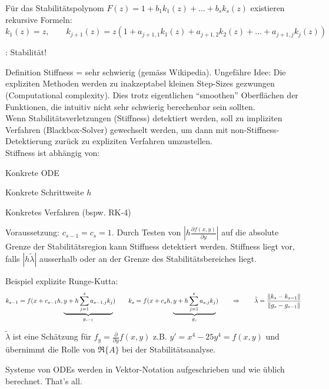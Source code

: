       \vspace{1em}
       
        Für das Stabilitätspolynom $F(z) = 1 + b_1 k_1(z) + \ldots + b_sk_s(z)$ existieren 
        rekursive Formeln:\\
        $k_1(z) = z, \qquad k_{j+1}(z) = z(1 + a_{j+1,1} k_1(z) + a_{j+1,2} k_2(z) + \ldots + a_{j+1,j} k_j(z))$
      
      \vspace{1em}
      : Stabilität!
    
      Definition Stiffness = sehr schwierig (gemäss Wikipedia). Ungefähre Idee: Die expliziten 
      Methoden werden zu inakzeptabel kleinen Step-Sizes gezwungen (Computational complexity). 
      Dies trotz eigentlichen "`smoothen"' Oberflächen der Funktionen, die intuitiv nicht sehr 
      schwierig berechenbar sein sollten. \\
      
      Wenn Stabilitätsverletzungen (Stiffness) detektiert werden, soll zu 
      impliziten Verfahren (Blackbox-Solver) gewechselt werden, um dann mit non-Stiffness-Detektierung 
      zurück zu expliziten Verfahren umzustellen.\\
      
      Stiffness ist abhängig von:
      \begin{liste}
        \item Konkrete ODE
        \item Konkrete Schrittweite $h$
        \item Konkretes Verfahren (bspw. RK-4)
      \end{liste}
      
        Voraussetzung: $c_{s-1} = c_s = 1$. Durch Testen von $\left|h \frac{\partial f(x,y)}{\partial y} \right|$ 
        auf die absolute Grenze der Stabilitätsregion kann
        Stiffness detektiert werden. 
        Stiffness liegt vor, falls $|h \tilde{\lambda}|$ ausserhalb
        oder an der Grenze des Stabilitätsbereiches liegt.
        
        
        Beispiel explizite Runge-Kutta: 
        $$k_{s-1} = f(x+c_{s-1} h, \underbrace{y + h \sum\limits_{j=1}^s a_{s-1,j}k_j}_{g_{s-1}}) \qquad       
        k_{s} = f(x+c_{s} h, \underbrace{y + h \sum\limits_{j=1}^s a_{s,j}k_j}_{g_{s}}) \qquad 
        \Rightarrow \qquad \tilde{\lambda} = \frac{\Arrowvert k_s - k_{s-1} \Arrowvert}{\Arrowvert g_s - g_{s-1} \Arrowvert}$$
        
        $\tilde{\lambda}$ ist eine Schätzung für $f_y = \frac{\partial}{\partial y}f(x,y)$ z.B. $y'=x^4-25y^4=f(x,y)$ 
         und übernimmt die Rolle von $\Re \{A\}$ bei der Stabilitätsanalyse. 
        
        
    Systeme von ODEs werden in Vektor-Notation aufgeschrieben und wie üblich berechnet. 
    That's all.
    
  